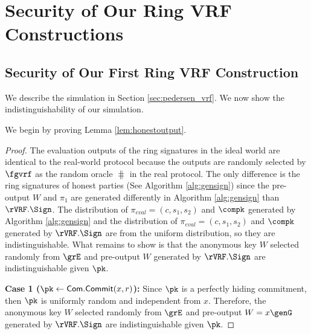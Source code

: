 
%
\section{Security of Our Ring VRF Constructions}

\subsection{Security of Our First Ring VRF Construction}
\label{ap:firstprotocolproof}
We describe the simulation in Section \ref{sec:pedersen_vrf}. We now show the indistinguishability of our simulation.

We begin by proving Lemma \ref{lem:honestoutput}.

\begin{proof}
	The evaluation outputs of the ring signatures in the ideal world are identical to the real-world protocol because  the outputs are randomly selected by $ \fgvrf $ as the random oracle $ \hash $ in the real protocol. The only difference is the ring signatures of honest parties (See Algorithm \ref{alg:gensign}) since the pre-output $ W $ and $ \pi_1 $ are generated differently in Algorithm \ref{alg:gensign} than $ \rVRF.\Sign $. The distribution of $ \pi_{eval} = (c,s_1, s_2) $ and $ \compk $ generated by Algorithm \ref{alg:gensign} and the distribution of $ \pi_{eval} = (c,s_1, s_2) $ and $ \compk $ generated by $ \rVRF.\Sign $ are from the uniform distribution, so they are indistinguishable. What remains to show is that the anonymous key $ W $ selected randomly from $ \grE $ and pre-output $	 W $ generated by $ \rVRF.\Sign $ are indistinguishable given $ \pk  $. 
	
	\textbf{Case 1 ($ \pk \leftarrow \mathsf{Com}.\mathsf{Commit}(x,r)$):} Since $ \pk$ is a perfectly hiding commitment, then  $ \pk $ is uniformly random and independent from $ x $. Therefore,  the anonymous key $ W $ selected randomly from $ \grE $ and pre-output $ W = x \genG $ generated by $ \rVRF.\Sign $ are indistinguishable given $ \pk  $.
	

\end{proof}
